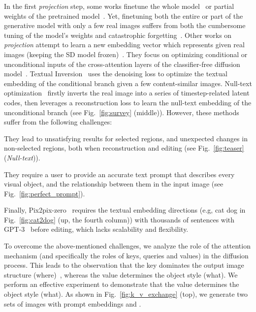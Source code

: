 \documentclass[twocolumn]{svjour3}          \smartqed  \usepackage{graphicx}
\begin{document}
In the first \emph{projection} step, some works finetune the whole model~\citep{Kawar2022ImagicTR, valevski2022unitune, ruiz2022dreambooth,kim2022diffusionclip,gal2023encoder,xiao2023fastcomposer} or  partial weights of the pretrained model~\citep{kumari2022multi,xie2023difffit}.  Yet,  finetuning both the entire or part of the generative model with only a few real images suffers from both the cumbersome tuning of the model's weights and catastrophic forgetting~\citep{kumari2022multi,wu2018memory,xie2023difffit}.  
Other works on \emph{projection} attempt to  learn a new embedding vector which represents given real images (keeping the SD model frozen)~\citep{ho2021classifier,gal2022image,avrahami2023break,han2023highly,tewel2023key,zhang2023prospect,dong2023prompt}. They focus on optimizing conditional or unconditional inputs of the cross-attention layers of the classifier-free diffusion model~\citep{ho2021classifier}. 
Textual Inversion~\citep{gal2022image} uses the denoising loss  to optimize the  textual embedding of the conditional branch given a few content-similar images. 
Null-text optimization~\citep{mokady2022null} firstly inverts the real image into a series of timestep-related latent codes, then leverages a reconstruction loss to learn the null-text embedding of the unconditional branch (see Fig.~\ref{fig:survey} (middle)). However, these methods suffer from the following challenges:
 \begin{enumerate*}[label=(\Roman*)]
    \item They lead to unsatisfying results for selected regions, and unexpected changes in non-selected regions, both when reconstruction and editing (see Fig.~\ref{fig:teaser} (\textit{Null-text})).
     \item They require a user to provide an accurate text prompt that describes every visual object,  and the relationship between them in the input image (see Fig.~\ref{fig:perfect_prompt}). 
 \end{enumerate*}
Finally, Pix2pix-zero~\citep{parmar2023zero} requires the textual embedding directions (e.g, cat  dog in Fig.~\ref{fig:cat2dog} (up, the fourth column)) with thousands of sentences with GPT-3~\citep{brown2020language} before editing, which lacks scalability and flexibility.

To overcome the above-mentioned challenges, we analyze the role of the attention mechanism (and specifically the roles of keys, queries and values) in the diffusion process. This leads to the observation that the key dominates the output image structure (where)~\citep{hertz2022prompt},  whereas the value determines the object style (what).  
We perform an effective experiment to demonstrate that the value determines the object style (what). As shown in Fig.~\ref{fig:k_v_exchange} (top),  we generate two sets of images with prompt embeddings  and .
\end{document}
